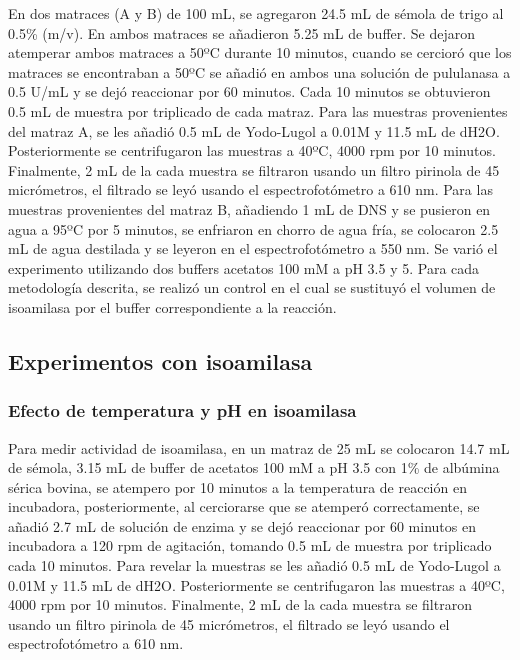 \documentclass{article}
\begin{document}
En dos matraces (A y B) de 100 mL, se agregaron 24.5 mL de sémola de trigo al 0.5\% (m/v). En ambos matraces se añadieron 5.25 mL de buffer. Se dejaron atemperar ambos matraces a 50ºC durante 10 minutos, cuando se cercioró que los matraces se encontraban a 50ºC se añadió en ambos una solución de pululanasa a 0.5 U/mL y se dejó reaccionar por 60 minutos. Cada 10 minutos se obtuvieron 0.5 mL de muestra por triplicado de cada matraz. Para las muestras provenientes del matraz A, se les añadió 0.5 mL de Yodo-Lugol a 0.01M y 11.5 mL de dH2O. Posteriormente se centrifugaron las muestras a 40ºC, 4000 rpm por 10 minutos. Finalmente,  2 mL de la cada muestra se filtraron usando un filtro pirinola de 45 micrómetros, el filtrado se leyó usando el espectrofotómetro a 610 nm. Para las muestras provenientes del matraz B, añadiendo 1 mL de DNS y se pusieron en agua a 95ºC por 5 minutos, se enfriaron en chorro de agua fría, se colocaron 2.5 mL de agua destilada y se leyeron en el espectrofotómetro a 550 nm. Se varió el experimento utilizando dos buffers acetatos 100 mM a pH 3.5 y 5.  Para cada metodología descrita, se realizó un control en el cual se sustituyó el volumen de isoamilasa por el buffer correspondiente a la reacción.

\subsection{Experimentos con isoamilasa}

\subsubsection{Efecto de temperatura y pH en isoamilasa}
Para medir actividad de isoamilasa, en un matraz de 25 mL se colocaron 14.7 mL de sémola, 3.15 mL de buffer de acetatos 100 mM a pH 3.5 con 1\% de albúmina sérica bovina, se atempero por 10 minutos a la temperatura de reacción en incubadora, posteriormente, al cerciorarse que se atemperó correctamente, se añadió 2.7 mL de solución de enzima y se dejó reaccionar por 60 minutos en incubadora a 120 rpm de agitación, tomando 0.5 mL de muestra por triplicado cada 10 minutos. Para revelar la muestras se les añadió 0.5 mL de Yodo-Lugol a 0.01M y 11.5 mL de dH2O. Posteriormente se centrifugaron las muestras a 40ºC, 4000 rpm por 10 minutos. Finalmente,  2 mL de la cada muestra se filtraron usando un filtro pirinola de 45 micrómetros, el filtrado se leyó usando el espectrofotómetro a 610 nm. \\
\end{document}
